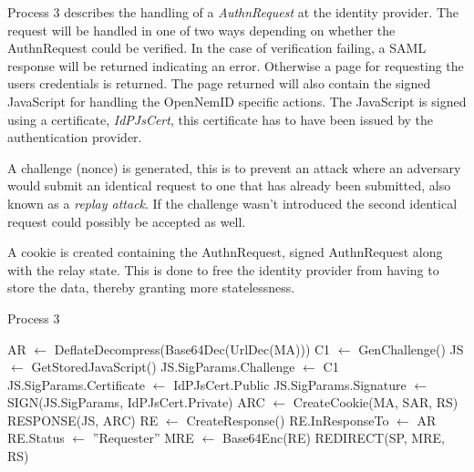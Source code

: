 \documentclass[twosided]{report}
\begin{document}
Process 3 describes the handling of a \emph{AuthnRequest} at the identity provider. The request will be handled in one of two ways depending on whether the AuthnRequest could be verified. In the case of verification failing, a SAML response will be returned indicating an error. Otherwise a page for requesting the users credentials is returned. The page returned will also contain the signed JavaScript for handling the OpenNemID specific actions. The JavaScript is signed using a certificate, \emph{IdPJsCert}, this certificate has to have been issued by the authentication provider.
\par
A challenge (nonce) is generated, this is to prevent an attack where an adversary would submit an identical request to one that has already been submitted, also known as a \emph{replay attack}. If the challenge wasn't introduced the second identical request could possibly be accepted as well.
\par
A cookie is created containing the AuthnRequest, signed AuthnRequest along with the relay state. This is done to free the identity provider from having to store the data, thereby granting more statelessness.
\begin{algorithm}[H]
	\caption{Process 3}
	\begin{algorithmic}
		\STATE AR $\leftarrow$ DeflateDecompress(Base64Dec(UrlDec(MA)))
			\STATE C1 $\leftarrow$ GenChallenge()
			\STATE JS $\leftarrow$ GetStoredJavaScript()
			\STATE JS.SigParams.Challenge $\leftarrow$ C1
			\STATE JS.SigParams.Certificate $\leftarrow$ IdPJsCert.Public
			\STATE JS.SigParams.Signature $\leftarrow$ SIGN(JS.SigParams, IdPJsCert.Private)
			\STATE ARC $\leftarrow$ CreateCookie(MA, SAR, RS)
			\RETURN RESPONSE(JS, ARC)
		\ELSE
			\STATE RE $\leftarrow$ CreateResponse()
			\STATE RE.InResponseTo $\leftarrow$ AR
			\STATE RE.Status $\leftarrow$ ”Requester”
			\STATE MRE $\leftarrow$ Base64Enc(RE)
			\RETURN REDIRECT(SP, MRE, RS)
		\ENDIF
	\end{algorithmic}
\end{algorithm}
\end{document}
